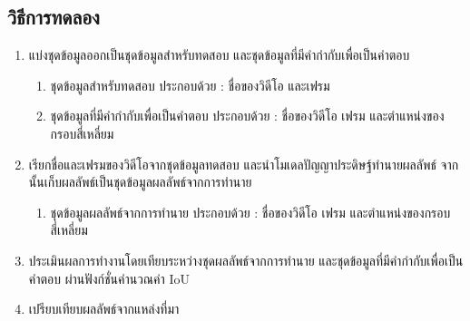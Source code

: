 \subsection*{วิธีการทดลอง}
	\begin{enumerate}
		\item แบ่งชุดข้อมูลออกเป็นชุดข้อมูลสำหรับทดสอบ และชุดข้อมูลที่มีคำกำกับเพื่อเป็นคำตอบ
			\begin{enumerate}
				\item ชุดข้อมูลสำหรับทดสอบ ประกอบด้วย : ชื่อของวิดีโอ และเฟรม
				\item ชุดข้อมูลที่มีคำกำกับเพื่อเป็นคำตอบ ประกอบด้วย : ชื่อของวิดีโอ เฟรม และตำแหน่งของกรอบสี่เหลี่ยม
			\end{enumerate}
		\item เรียกชื่อและเฟรมของวิดีโอจากชุดข้อมูลทดสอบ และนำโมเดลปัญญาประดิษฐ์ทำนายผลลัพธ์ จากนั้นเก็บผลลัพธ์เป็นชุดข้อมูลผลลัพธ์จากการทำนาย
			\begin{enumerate}
				\item ชุดข้อมูลผลลัพธ์จากการทำนาย ประกอบด้วย : ชื่อของวิดีโอ เฟรม และตำแหน่งของกรอบสี่เหลี่ยม
			\end{enumerate}
		\item ประเมินผลการทำงานโดยเทียบระหว่างชุดผลลัพธ์จากการทำนาย และชุดข้อมูลที่มีคำกำกับเพื่อเป็นคำตอบ ผ่านฟังก์ชั่นคำนวณค่า IoU		
		\item เปรียบเทียบผลลัพธ์จากแหล่งที่มา
\end{enumerate}

